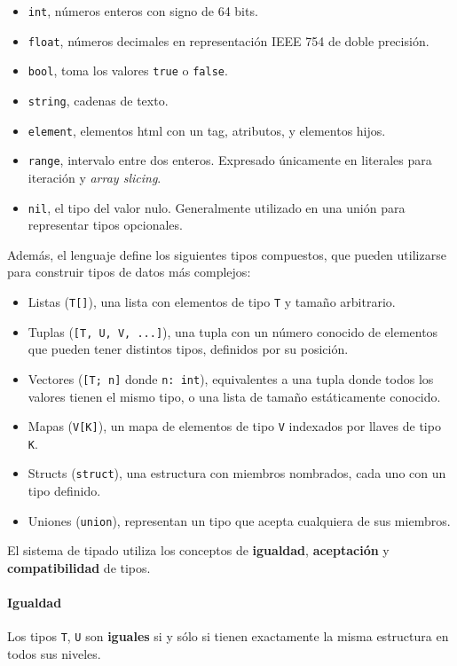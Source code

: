 \begin{itemize}
	\item \texttt{int}, números enteros con signo de 64 bits.
	\item \texttt{float}, números decimales en representación IEEE 754 de doble precisión.
	\item \texttt{bool}, toma los valores \texttt{true} o \texttt{false}.
	\item \texttt{string}, cadenas de texto.
	\item \texttt{element}, elementos html con un tag, atributos, y elementos hijos.
	\item \texttt{range}, intervalo entre dos enteros. Expresado únicamente en literales para iteración y \textit{array slicing}.
	\item \texttt{nil}, el tipo del valor nulo. Generalmente utilizado en una unión para representar tipos opcionales.
\end{itemize}

Además, el lenguaje define los siguientes tipos compuestos, que pueden utilizarse para construir tipos de datos más complejos:

\begin{itemize}
	\item Listas (\texttt{T[]}), una lista con elementos de tipo \texttt{T} y tamaño arbitrario.
	\item Tuplas (\texttt{[T, U, V, ...]}), una tupla con un número conocido de elementos que pueden tener distintos tipos, definidos por su posición.
	\item Vectores (\texttt{[T; n]} donde \texttt{n: int}), equivalentes a una tupla donde todos los valores tienen el mismo tipo, o una lista de tamaño estáticamente conocido.
	\item Mapas (\texttt{V[K]}), un mapa de elementos de tipo \texttt{V} indexados por llaves de tipo \texttt{K}.
	\item Structs (\texttt{struct}), una estructura con miembros nombrados, cada uno con un tipo definido.
	\item Uniones (\texttt{union}), representan un tipo que acepta cualquiera de sus miembros.
\end{itemize}

El sistema de tipado utiliza los conceptos de \textbf{igualdad}, \textbf{aceptación} y \textbf{compatibilidad} de tipos.

\paragraph{Igualdad}
Los tipos \texttt{T}, \texttt{U} son \textbf{iguales} si y sólo si tienen exactamente la misma estructura en todos sus niveles.


